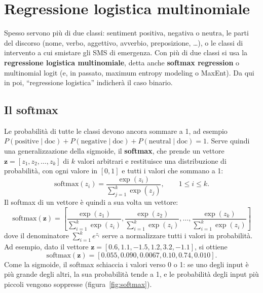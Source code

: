 \section{Regressione logistica multinomiale}
Spesso servono più di due classi: sentiment positiva, negativa o neutra, le parti del discorso (nome, verbo, aggettivo, avverbio, preposizione, \dots), o le classi di intervento a cui smistare gli SMS di emergenza. Con più di due classi si usa la \textbf{regressione logistica multinomiale}, detta anche \textbf{softmax regression} o multinomial logit (e, in passato, maximum entropy modeling o MaxEnt). Da qui in poi, \enquote{regressione logistica} indicherà il caso binario.

\subsection{Il softmax}
Le probabilità di tutte le classi devono ancora sommare a 1, ad esempio $P(\text{positive} \mid \text{doc}) + P(\text{negative} \mid \text{doc}) + P(\text{neutral} \mid \text{doc}) = 1$. Serve quindi una generalizzazione della sigmoide, il \textbf{softmax}, che prende un vettore $\mathbf{z} = [z_1, z_2, \dots, z_k]$ di $k$ valori arbitrari e restituisce una distribuzione di probabilità, con ogni valore in $[0, 1]$ e tutti i valori che sommano a 1:
\begin{equation}
\mathrm{softmax}(z_i) = \frac{\exp(z_i)}{\sum_{j=1}^{k} \exp(z_j)}, \qquad 1 \leq i \leq k.
\end{equation}
Il softmax di un vettore è quindi a sua volta un vettore:
\begin{equation}
\mathrm{softmax}(\mathbf{z}) = \left[\frac{\exp(z_1)}{\sum_{i=1}^{k} \exp(z_i)}, \frac{\exp(z_2)}{\sum_{i=1}^{k} \exp(z_i)}, \dots, \frac{\exp(z_k)}{\sum_{i=1}^{k} \exp(z_i)}\right]
\end{equation}
dove il denominatore $\sum_{i=1}^{k} e^{z_i}$ serve a normalizzare tutti i valori in probabilità. Ad esempio, dato il vettore $\mathbf{z} = [0.6, 1.1, -1.5, 1.2, 3.2, -1.1]$, si ottiene
\[
\mathrm{softmax}(\mathbf{z}) = [0.055, 0.090, 0.0067, 0.10, 0.74, 0.010].
\]
Come la sigmoide, il softmax schiaccia i valori verso 0 o 1: se uno degli input è più grande degli altri, la sua probabilità tende a 1, e le probabilità degli input più piccoli vengono soppresse (figura~\ref{fig:softmax}).

